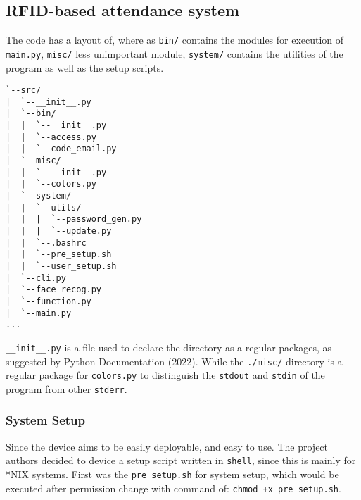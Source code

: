 \documentclass[12pt]{article}
\begin{document}
\subsection*{RFID-based attendance system}

The code has a layout of, where as \texttt{bin/} contains the modules for execution of \texttt{main.py}, \texttt{misc/} less unimportant module, \texttt{system/} contains the utilities of the program as well as the setup scripts.

\singlespacing
\begin{lstlisting}
`--src/
|  `--__init__.py
|  `--bin/
|  |  `--__init__.py
|  |  `--access.py
|  |  `--code_email.py	
|  `--misc/
|  |  `--__init__.py
|  |  `--colors.py
|  `--system/
|  |  `--utils/
|  |  |  `--password_gen.py
|  |  |  `--update.py
|  |  `--.bashrc
|  |  `--pre_setup.sh
|  |  `--user_setup.sh
|  `--cli.py
|  `--face_recog.py
|  `--function.py
|  `--main.py
...
\end{lstlisting}
\doublespacing

\texttt{\_\_init\_\_.py} is a file used to declare the directory as a regular packages, as suggested by Python Documentation (2022). While the \texttt{./misc/} directory is a regular package for \texttt{colors.py} to distinguish the \texttt{stdout} and \texttt{stdin} of the program from other \texttt{stderr}.

\subsubsection*{System Setup}

Since the device aims to be easily deployable, and easy to use. The project authors decided to device a setup script written in \texttt{shell}, since this is mainly for *NIX systems. First was the \texttt{pre\_setup.sh} for system setup, which would be executed after permission change with command of: \texttt{chmod +x pre\_setup.sh}.
\end{document}
